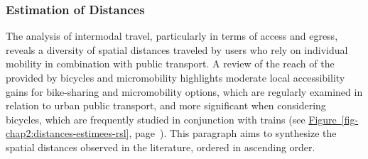 \begin{refsegment}
\subsubsection*{Estimation of Distances
    \label{chap2:estimation-distances}
    }

The analysis of intermodal travel, particularly in terms of access and egress, reveals a diversity of spatial distances traveled by users who rely on individual mobility in combination with public transport. A review of the reach of the  provided by bicycles and micromobility highlights moderate local accessibility gains for bike-sharing and micromobility options, which are regularly examined in relation to urban public transport, and more significant when considering bicycles, which are frequently studied in conjunction with trains (see \hyperref[fig-chap2:distances-estimees-rsl]{Figure~\ref{fig-chap2:distances-estimees-rsl}}, page~\pageref{fig-chap2:distances-estimees-rsl}). This paragraph aims to synthesize the spatial distances observed in the literature, ordered in ascending order.%


\end{refsegment}
